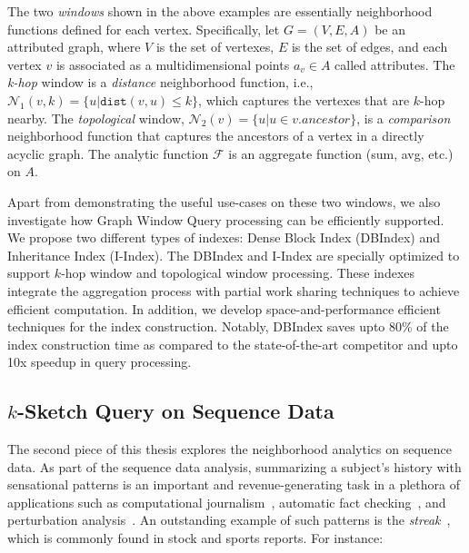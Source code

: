 
The two \emph{windows} shown in the above examples are essentially neighborhood functions defined for each vertex. Specifically, let $G=(V,E,A)$ be an attributed graph, where $V$ is the set of vertexes, $E$ is the set of edges, and each vertex $v$ is associated as a multidimensional points $a_v \in A$ called attributes.
The \emph{k-hop} window is a \emph{distance} neighborhood function, 
i.e., $\mathcal{N}_1(v,k)= \{u|\mathtt{dist}(v,u) \leq k\}$, 
which captures the vertexes that are $k$-hop nearby. 
The \emph{topological} window,  $\mathcal{N}_2(v)= \{u | u \in v.ancestor\}$,
is a \emph{comparison} neighborhood function that captures
the ancestors of a vertex in a directly acyclic graph.  The analytic function $\mathcal{F}$ is an aggregate function (sum, avg, etc.) on $A$.

Apart from demonstrating the useful use-cases on these two windows, 
we also investigate how Graph Window Query processing can be efficiently supported.  We propose
two different types of indexes: Dense Block Index (DBIndex)
and Inheritance Index (I-Index). The DBIndex and I-Index
are specially optimized to support $k$-hop window and topological
window processing. These indexes
integrate the aggregation process with partial work sharing techniques
to achieve efficient computation.
In addition, we develop space-and-performance efficient techniques
for the index construction. Notably, DBIndex saves upto 80\%
of the index construction time as compared to the state-of-the-art competitor and upto 10x
speedup in query processing. 


\subsection{$k$-Sketch Query on Sequence Data}
The second piece of this thesis explores the neighborhood analytics on sequence data. 
As part of the sequence data analysis,
summarizing a subject's history with sensational patterns
is an important and revenue-generating task in a plethora of applications 
such as computational journalism~\cite{cohen2011computational,zhang2014discovering}, automatic fact checking~\cite{hassan2014data,walenz2014finding}, and perturbation analysis~\cite{Walenz:2016:PAD:3007328.3007330}.
%
An outstanding example of such patterns is the \emph{streak}~\cite{zhang2014discovering},
which is commonly found in stock
and sports reports. For instance:

